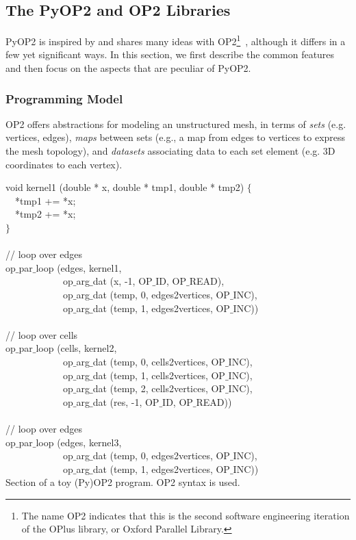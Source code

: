 \subsection{The PyOP2 and OP2 Libraries}
\label{sec:bkg:op2}
PyOP2 is inspired by and shares many ideas with OP2\footnote{The name OP2 indicates that this is the second software engineering iteration of the OPlus library, or Oxford Parallel Library.}~\citep{op2-main}, although it differs in a few yet significant ways. In this section, we first describe the common features and then focus on the aspects that are peculiar of PyOP2.

\subsubsection{Programming Model}

OP2 offers abstractions for modeling an unstructured mesh, in terms of {\em sets} (e.g. vertices, edges), {\em maps} between sets (e.g., a map from edges to vertices to express the mesh topology), and {\em datasets} associating data to each set element (e.g. 3D coordinates to each vertex).

\begin{algorithm}[t]
\scriptsize\ttfamily
{}

void kernel1 (double * x, double * tmp1, double * tmp2) $\lbrace$\\
~~*tmp1 += *x;\\
~~*tmp2 += *x;\\
$\rbrace$~\\
~\\
// loop over edges\\
op$\_$par$\_$loop (edges, kernel1,\\
~~~~~~~~~~~~op$\_$arg$\_$dat (x, -1, OP$\_$ID, OP$\_$READ),\\
~~~~~~~~~~~~op$\_$arg$\_$dat (temp, 0, edges2vertices, OP$\_$INC),\\
~~~~~~~~~~~~op$\_$arg$\_$dat (temp, 1, edges2vertices, OP$\_$INC))\\
~\\
// loop over cells\\
op$\_$par$\_$loop (cells, kernel2,\\
~~~~~~~~~~~~op$\_$arg$\_$dat (temp, 0, cells2vertices, OP$\_$INC),\\
~~~~~~~~~~~~op$\_$arg$\_$dat (temp, 1, cells2vertices, OP$\_$INC),\\
~~~~~~~~~~~~op$\_$arg$\_$dat (temp, 2, cells2vertices, OP$\_$INC),\\
~~~~~~~~~~~~op$\_$arg$\_$dat (res, -1, OP$\_$ID, OP$\_$READ))\\
~\\
// loop over edges\\
op$\_$par$\_$loop (edges, kernel3,\\
~~~~~~~~~~~~op$\_$arg$\_$dat (temp, 0, edges2vertices, OP$\_$INC),\\
~~~~~~~~~~~~op$\_$arg$\_$dat (temp, 1, edges2vertices, OP$\_$INC))\\

\caption{Section of a toy (Py)OP2 program. OP2 syntax is used.}
\label{code:op2program}
\end{algorithm}


